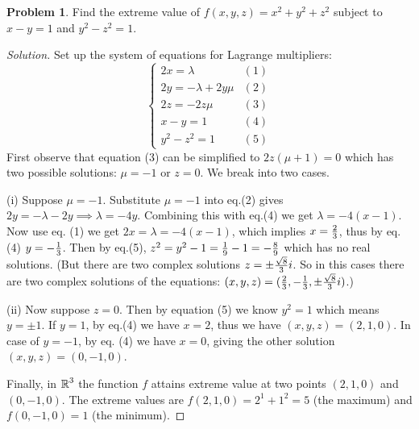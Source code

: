 \documentclass[12pt]{amsart}%
\theoremstyle{plain}
\theoremstyle{definition}
\newtheorem{prob}[theorem]{Problem}
\theoremstyle{special}
\newcommand{\sol}[1]{
{\begin{proof}[Solution]#1\end{proof}}
}
\newcommand{\Prob}[1]{\begin{tcolorbox}%
\begin{prob}
	#1
\end{prob}
\end{tcolorbox}	
}
\begin{document}
\Prob{Find the extreme value of $f(x,y,z)=x^2+y^2+z^2$ subject to $x-y=1$ and $y^2-z^2=1$.}
\sol{
Set up the system of equations for Lagrange multipliers:
\[\begin{cases}
	2x=\lambda &(1)\\
	2y=-\lambda+2y\mu&(2)\\
	2z=-2z\mu & (3)\\
	x-y=1&(4)\\
	y^2-z^2=1&(5)
\end{cases}\]
First observe that equation (3) can be simplified to $2z(\mu+1)=0$ which has two possible solutions: $\mu=-1$ or $z=0$. We break into two cases.

(i) Suppose $\mu=-1$. Substitute $\mu=-1$ into eq.(2) gives $2y=-\lambda-2y\implies \lambda=-4y$. Combining this with  eq.(4) we get $\lambda=-4(x-1)$. Now use eq. (1) we get $2x=\lambda=-4(x-1)$, which implies $x={2\over 3}$, thus by eq.(4) $y=-{1\over 3}$. Then by eq.(5), $z^2=y^2-1={1\over 9}-1=-{8\over 9}$ which has no real solutions. (But there are two complex solutions $z=\pm {\sqrt{8}\over 3}i$. So in this cases there are two complex solutions of the equations: $(x,y,z)=({2\over 3},-{1\over 3},\pm {\sqrt{8}\over 3}i)$.)

(ii) Now suppose $z=0$. Then by equation (5) we know $y^2=1$ which means $y=\pm 1$. If $y=1$, by eq.(4) we have $x=2$, thus we have $(x,y,z)=(2,1,0)$. In case of $y=-1$, by eq. (4) we have $x=0$, giving the other solution $(x,y,z)=(0,-1,0)$.

Finally, in $\operatorname{\mathbb{R}}^3$ the function $f$ attains extreme value at two points $(2,1,0)$ and $(0,-1,0)$. The extreme values are $f(2,1,0)=2^1+1^2=5 $ (the maximum) and $f(0,-1,0)=1$ (the minimum).
}
\newpage
\end{document}
